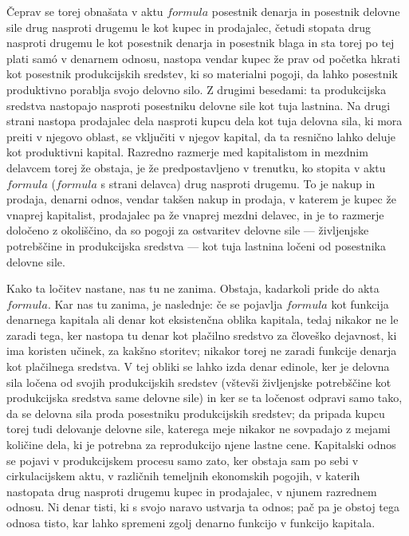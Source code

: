 \documentclass[kapital_02.tex]{subfiles}
\begin{document}
Čeprav se torej obnašata v aktu \( formula \) posestnik denarja in posestnik delovne sile drug nasproti drugemu le kot kupec in prodajalec, četudi stopata drug nasproti drugemu le kot posestnik denarja in posestnik blaga in sta torej po tej plati sam\'o v denarnem odnosu, nastopa vendar kupec že prav od početka hkrati kot posestnik produkcijskih sredstev, ki so materialni pogoji, da lahko posestnik produktivno porablja svojo delovno silo. Z drugimi besedami: ta produkcijska sredstva nastopajo nasproti posestniku delovne sile kot tuja lastnina. Na drugi strani nastopa prodajalec dela nasproti kupcu dela kot tuja delovna sila, ki mora preiti v njegovo oblast, se vključiti v njegov kapital, da ta resnično lahko deluje kot produktivni kapital. Razredno razmerje med kapitalistom in mezdnim delavcem torej že obstaja, je že predpostavljeno v trenutku, ko stopita v aktu \( formula \) (\( formula \) s strani delavca) drug nasproti drugemu. To je nakup in prodaja, denarni odnos, vendar takšen nakup in prodaja, v katerem je kupec že vnaprej kapitalist, prodajalec pa že vnaprej mezdni delavec, in je to razmerje določeno z okoliščino, da so pogoji za ostvaritev delovne sile --- življenjske potrebščine in produkcijska sredstva --- kot tuja lastnina ločeni od posestnika delovne sile.

Kako ta ločitev nastane, nas tu ne zanima. Obstaja, kadarkoli pride do akta \( formula \). Kar nas tu zanima, je naslednje: če se pojavlja \( formula \) kot funkcija denarnega kapitala ali denar kot eksistenčna oblika kapitala, tedaj nikakor ne le zaradi tega, ker nastopa tu denar kot plačilno sredstvo za človeško dejavnost, ki ima koristen učinek, za kakšno storitev; nikakor torej ne zaradi funkcije denarja kot plačilnega sredstva. V tej obliki se lahko izda denar edinole, ker je delovna sila ločena od svojih produkcijskih sredstev (vštevši življenjske potrebščine kot produkcijska sredstva same delovne sile) in ker se ta ločenost odpravi samo tako, da se delovna sila proda posestniku produkcijskih sredstev; da pripada kupcu torej tudi delovanje delovne sile, katerega meje nikakor ne sovpadajo z mejami količine dela, ki je potrebna za reprodukcijo njene lastne cene. Kapitalski odnos se pojavi v produkcijskem procesu samo zato, ker obstaja sam po sebi v cirkulacijskem aktu, v različnih temeljnih ekonomskih pogojih, v katerih nastopata drug nasproti drugemu kupec in prodajalec, v njunem razrednem odnosu. Ni denar tisti, ki s svojo naravo ustvarja ta odnos; pač pa je obstoj tega odnosa tisto, kar lahko spremeni zgolj denarno funkcijo v funkcijo kapitala.
\end{document}

